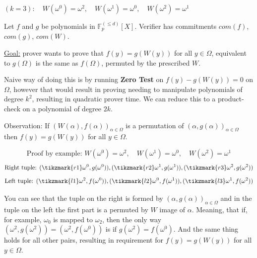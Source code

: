 \documentclass[../lecture-notes.tex]{subfiles}
\begin{document}
\begin{example}
 $(k=3): \quad W(\omega^0) = \omega^2, \quad W(\omega^1) = \omega^0, \quad W(\omega^2) = \omega^1$
\end{example}

Let \(f\) and \(g\) be polynomials in \(\mathbb{F}_p^{(\leq d)}[X]\). Verifier has commitments \(com(f)\), \(com(g)\), \(com(W)\).

\underline{Goal:} prover wants to prove that \(f(y) = g(W(y))\) for all \(y \in \Omega\), equivalent to \(g(\Omega)\) is the same as \(f(\Omega)\), permuted by the prescribed \(W\).

Naive way of doing this is by running \textbf{Zero Test} on \(f(y) - g(W(y)) = 0\) on \(\Omega\), however that would result in proving needing to manipulate polynomials of degree \(k^2\), resulting in quadratic prover time. We can reduce this to a product-check on a polynomial of degree \(2k\).

\begin{remark}
Observation: If \((W(\alpha), f(\alpha))_{\alpha \in \Omega}\) is a permutation of \((\alpha, g(\alpha))_{\alpha \in \Omega}\) then \(f(y) = g(W(y))\) for all \(y \in \Omega \).
\end{remark}

\begin{example}
\[
\text{Proof by example: } W(\omega^0) = \omega^2, \quad W(\omega^1) = \omega^0, \quad W(\omega^2) = \omega^1 
\]
\[
\text{Right tuple: } (\tikzmark{r1}\omega^0, g(\omega^0)), (\tikzmark{r2}\omega^1, g(\omega^1)), (\tikzmark{r3}\omega^2, g(\omega^2))
\]
\[
\text{Left tuple: } (\tikzmark{l1}\omega^2, f(\omega^0)), (\tikzmark{l2}\omega^0, f(\omega^1)), (\tikzmark{l3}\omega^1, f(\omega^2))
\]

You can see that the tuple on the right is formed by \((\alpha, g(\alpha))_{\alpha \in \Omega}\) and in the tuple on the left the first part is a permuted by \(W\) image of \(\alpha\). Meaning, that if, for example, \(\omega_0\) is mapped to \(\omega_2\), then the only way \((\omega^2, g(\omega^2)) = (\omega^2, f(\omega^0))\) is if \(g(\omega^2) = f(\omega^0)\). And the same thing holds for all other pairs, resulting in requirement for \(f(y) = g(W(y))\) for all \(y \in \Omega \).
\end{example}
\end{document}
